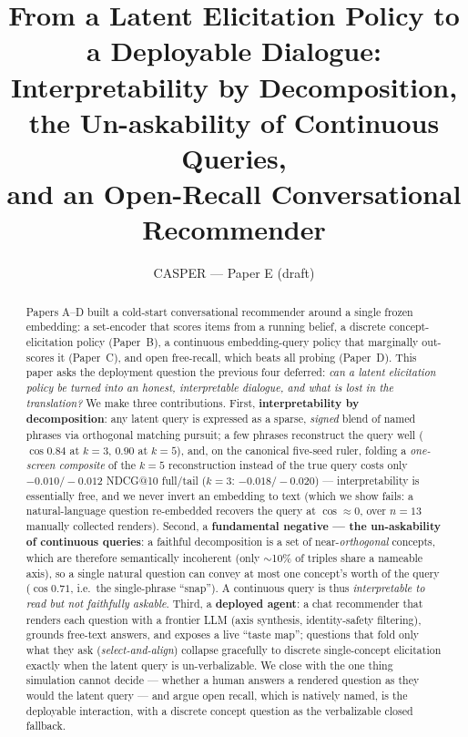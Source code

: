 \documentclass[11pt]{article}
\title{\textbf{From a Latent Elicitation Policy to a Deployable Dialogue:\\
Interpretability by Decomposition, the Un-askability of Continuous Queries,\\
and an Open-Recall Conversational Recommender}}
\author{CASPER --- Paper E (draft)}
\date{}
\begin{document}
\maketitle

\begin{abstract}
Papers A--D built a cold-start conversational recommender around a single frozen embedding: a set-encoder that
scores items from a running belief, a discrete concept-elicitation policy (Paper~B), a continuous embedding-query
policy that marginally out-scores it (Paper~C), and open free-recall, which beats all probing (Paper~D). This paper
asks the deployment question the previous four deferred: \emph{can a latent elicitation policy be turned into an
honest, interpretable dialogue, and what is lost in the translation?} We make three contributions. First,
\textbf{interpretability by decomposition}: any latent query is expressed as a sparse, \emph{signed} blend of named
phrases via orthogonal matching pursuit; a few phrases reconstruct the query well ($\cos 0.84$ at $k{=}3$, $0.90$ at
$k{=}5$), and, on the canonical five-seed ruler, folding a \emph{one-screen composite} of the $k{=}5$ reconstruction
instead of the true query costs only $-0.010/-0.012$ NDCG@10 full/tail ($k{=}3$: $-0.018/-0.020$) --- interpretability is
essentially free, and we never invert an embedding to text (which we show fails: a natural-language question re-embedded
recovers the query at $\cos\!\approx\!0$, over $n{=}13$ manually collected renders). Second, a \textbf{fundamental
negative --- the un-askability of continuous queries}: a faithful
decomposition is a set of near-\emph{orthogonal} concepts, which are therefore semantically incoherent (only
$\sim$10\% of triples share a nameable axis), so a single natural question can convey at most one concept's worth of
the query ($\cos 0.71$, i.e.\ the single-phrase ``snap''). A continuous query is thus \emph{interpretable to read but
not faithfully askable}. Third, a \textbf{deployed agent}: a chat recommender that renders each question with a
frontier LLM (axis synthesis, identity-safety filtering), grounds free-text answers, and exposes a live ``taste map'';
questions that fold only what they ask (\emph{select-and-align}) collapse gracefully to discrete single-concept
elicitation exactly when the latent query is un-verbalizable. We close with the one thing simulation cannot decide ---
whether a human answers a rendered question as they would the latent query --- and argue open recall, which is
natively named, is the deployable interaction, with a discrete concept question as the verbalizable closed fallback.
\end{abstract}
\end{document}
